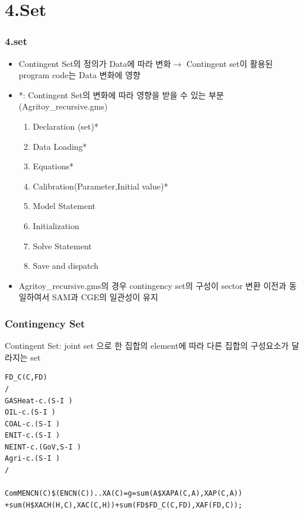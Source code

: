 \documentclass{beamer}
\begin{document}
\section{4.Set}

\begin{frame}
	\frametitle{4.set}
\begin{itemize}
\item{Contingent Set의 정의가 Data에 따라 변화$\rightarrow$ Contingent set이 활용된 program code는 Data 변화에 영향}
\bigskip
\item{*: Contingent Set의 변화에 따라 영향을 받을 수 있는 부분(Agritoy\_recursive.gms)}
\begin{small}
\begin{enumerate}
\item{Declaration (set)*}
\item{Data Loading*}
\item{Equations*}
\item{Calibration(Parameter,Initial value)*}
\item{Model Statement}
\item{Initialization}
\item{Solve Statement}
\item{Save and dispatch}
\end{enumerate}
\end{small}
\bigskip
\item{Agritoy\_recursive.gms의 경우 contingency set의 구성이 sector 변환 이전과 동일하여서 SAM과 CGE의 일관성이 유지}\end{itemize}
\end{frame}

\begin{frame}[fragile]
	\frametitle{Contingency Set}

Contingent Set: joint set 으로 한 집합의 element에 따라 다른 집합의 구성요소가 달라지는 set
\begin{scriptsize}
\begin{verbatim}
FD_C(C,FD)
/
GASHeat-c.(S-I )
OIL-c.(S-I )
COAL-c.(S-I )
ENIT-c.(S-I )
NEINT-c.(GoV,S-I )
Agri-c.(S-I )
/

ComMENCN(C)$(ENCN(C))..XA(C)=g=sum(A$XAPA(C,A),XAP(C,A))      
+sum(H$XACH(H,C),XAC(C,H))+sum(FD$FD_C(C,FD),XAF(FD,C));
\end{verbatim}
\end{scriptsize}
\end{frame}
\end{document}
